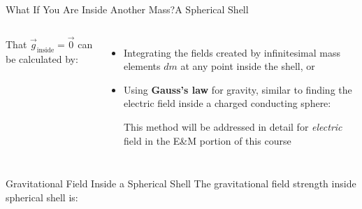\documentclass[12pt,compress,aspectratio=169]{beamer}
\begin{document}
\begin{frame}{What If You Are Inside Another Mass?}{A Spherical Shell}
  \begin{columns}

    That $\vec g_\text{inside}=\vec 0$ can be calculated by:
    \begin{itemize}
    \item Integrating the fields created by infinitesimal mass elements $dm$ at
      any point inside the shell, or
    \item Using \textbf{Gauss's law} for gravity, similar to finding the
      electric field inside a charged conducting sphere:
      

      This method will be addressed in detail for \emph{electric} field in the
      E\&M portion of this course
    \end{itemize}
  \end{columns}
\end{frame}



\begin{frame}{Gravitational Field Inside a Spherical Shell}
  The gravitational field strength inside spherical shell is:
  \begin{center}
  \end{center}
\end{frame}
\end{document}
